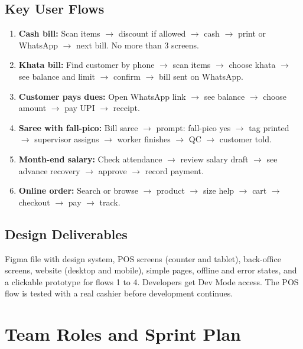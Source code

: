\documentclass[11pt,a4paper]{article}
\begin{document}
\subsection{Key User Flows}
\begin{enumerate}
\item \textbf{Cash bill:} Scan items $\rightarrow$ discount if allowed $\rightarrow$ cash $\rightarrow$ print or WhatsApp $\rightarrow$ next bill. No more than 3 screens.
\item \textbf{Khata bill:} Find customer by phone $\rightarrow$ scan items $\rightarrow$ choose khata $\rightarrow$ see balance and limit $\rightarrow$ confirm $\rightarrow$ bill sent on WhatsApp.
\item \textbf{Customer pays dues:} Open WhatsApp link $\rightarrow$ see balance $\rightarrow$ choose amount $\rightarrow$ pay UPI $\rightarrow$ receipt.
\item \textbf{Saree with fall-pico:} Bill saree $\rightarrow$ prompt: fall-pico yes $\rightarrow$ tag printed $\rightarrow$ supervisor assigns $\rightarrow$ worker finishes $\rightarrow$ QC $\rightarrow$ customer told.
\item \textbf{Month-end salary:} Check attendance $\rightarrow$ review salary draft $\rightarrow$ see advance recovery $\rightarrow$ approve $\rightarrow$ record payment.
\item \textbf{Online order:} Search or browse $\rightarrow$ product $\rightarrow$ size help $\rightarrow$ cart $\rightarrow$ checkout $\rightarrow$ pay $\rightarrow$ track.
\end{enumerate}

\subsection{Design Deliverables}
Figma file with design system, POS screens (counter and tablet), back-office screens, website (desktop and mobile), simple pages, offline and error states, and a clickable prototype for flows 1 to 4. Developers get Dev Mode access. The POS flow is tested with a real cashier before development continues.

\section{Team Roles and Sprint Plan}
\end{document}
